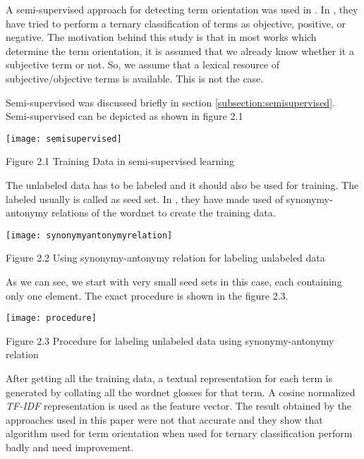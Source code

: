 A semi-supervised approach for detecting term orientation was used in \citep*{esuli2006determining}. 
In \citep*{esuli2006determining}, they have tried to perform a ternary classification of terms as objective, positive, or negative. 
The motivation behind this study is that in most works which determine the term orientation, it is assumed that we already know 
whether it a subjective term or not. So, we assume that a lexical resource of subjective/objective terms is available. This is not 
the case. 

Semi-supervised was discussed briefly in section \ref{subsection:semisupervised}. Semi-supervised can be depicted as shown in figure 2.1

\texttt{[image: semisupervised]}

\begin{center}
 Figure 2.1 Training Data in semi-supervised learning
\end{center}

 
The unlabeled data has to be labeled and it should also be used for training. The labeled usually is called as seed set.
In \citep*{esuli2006determining}, they have made used of synonymy-antonymy relations of the wordnet to create the training data. 

\texttt{[image: synonymyantonymyrelation]}
\begin{center}
 Figure 2.2 Using synonymy-antonymy relation for labeling unlabeled data
\end{center}


As we can see, we start with very small seed sets in this case, each containing only one element. The exact procedure is shown in 
the figure 2.3.

\texttt{[image: procedure]}
\begin{center}
 Figure 2.3 Procedure for labeling unlabeled data using synonymy-antonymy relation
\end{center}


\par
After getting all the training data, a textual representation for each term is generated by collating all the wordnet glosses
for that term. A cosine normalized \textit{TF-IDF} representation is used as the feature vector. The result obtained by the approaches used
in this paper were not that accurate and they show that algorithm used for term orientation when used for ternary classification
perform badly and need improvement.

